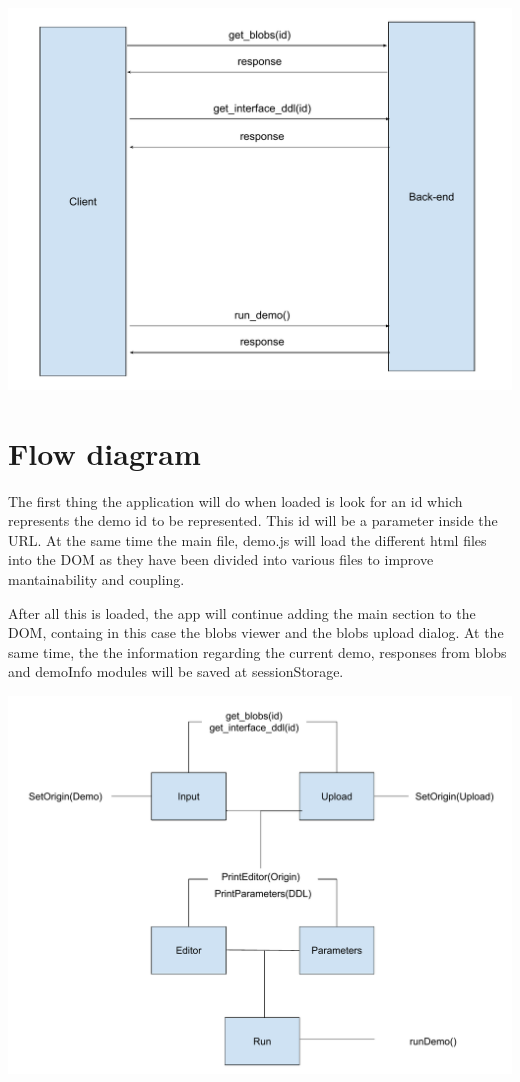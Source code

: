 \includegraphics[width=\textwidth]{images/client_server_interaction}


\section{Flow diagram}
The first thing the application will do when loaded is look for an id which represents
the demo id to be represented. This id will be a parameter inside the URL.
At the same time the main file, demo.js will load the different html files into the DOM
as they have been divided into various files to improve mantainability and coupling.

After all this is loaded, the app will continue adding the main section to the DOM,
 containg in this case the blobs viewer and the blobs upload dialog. At the same time, the 
 the information regarding the current demo, responses from blobs and demoInfo modules 
 will be saved at sessionStorage.
 
\includegraphics[width=\textwidth]{images/flow}

